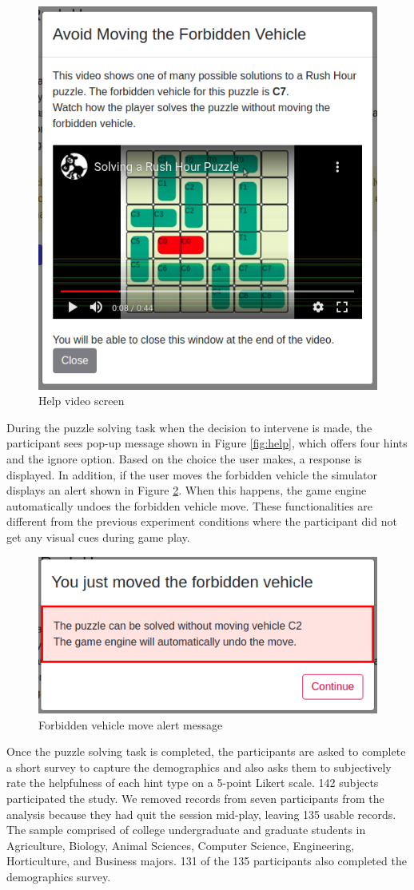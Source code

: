 \begin{figure}[!htb]
  \centering
  \includegraphics[width=0.6\columnwidth, keepaspectratio=true]{img/help.png}
  \caption{Help video screen}
  \label{fig:video}
\end{figure}

During the puzzle solving task when the decision to intervene is made, the participant sees pop-up message shown in Figure \ref{fig:help}, which offers four hints and the ignore option. Based on the choice the user makes, a response is displayed. In addition, if the user moves the forbidden vehicle the simulator displays an alert shown in Figure \ref{fig:badcar}. When this happens, the game engine automatically undoes the forbidden vehicle move. These functionalities are different from the previous experiment conditions where the participant did not get any visual cues during game play.
\begin{figure}[!htb]
  \centering
  \includegraphics[width=0.5\columnwidth, keepaspectratio=true]{img/badcaralert.png}
  \caption{Forbidden vehicle move alert message}
  \label{fig:badcar}
\end{figure}
Once the puzzle solving task is completed, the participants are asked to complete a short survey to capture the demographics and also asks them to subjectively rate the helpfulness of each hint type on a 5-point Likert scale. 142 subjects participated the study. We removed records from seven participants from the analysis because they had quit the session mid-play, leaving 135 usable records. The sample comprised of college undergraduate and graduate students in Agriculture, Biology, Animal Sciences, Computer Science, Engineering, Horticulture, and Business majors. 131 of the 135 participants also completed the demographics survey.
